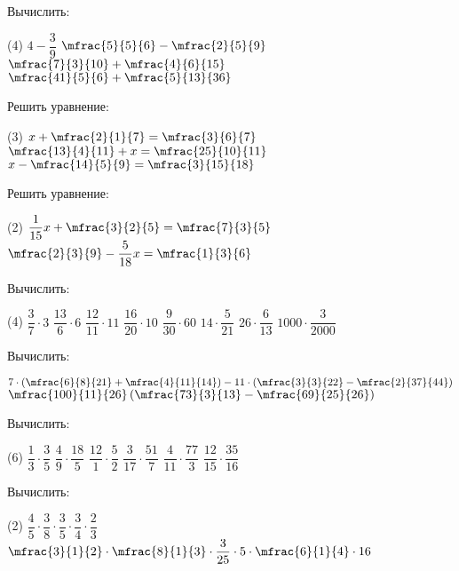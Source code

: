 \begin{class}[number=4]
	\begin{listofex}
		\item Вычислить:
		\begin{tasks}(4)
			\task \( 4-\dfrac{3}{9} \)
			\task \( \mfrac{5}{5}{6}-\mfrac{2}{5}{9} \)
			\task \( \mfrac{7}{3}{10}+\mfrac{4}{6}{15} \)
			\task \( \mfrac{41}{5}{6}+\mfrac{5}{13}{36} \)
		\end{tasks}
		\item Решить уравнение:
		\begin{tasks}(3)
			\task \( x+\mfrac{2}{1}{7}=\mfrac{3}{6}{7} \)
			\task \( \mfrac{13}{4}{11}+x=\mfrac{25}{10}{11} \)
			\task \( x-\mfrac{14}{5}{9}=\mfrac{3}{15}{18} \)
		\end{tasks}
		\item Решить уравнение:
		\begin{tasks}(2)
			\task \( \dfrac{1}{15}x+\mfrac{3}{2}{5}=\mfrac{7}{3}{5} \)
			\task \( \mfrac{2}{3}{9}-\dfrac{5}{18}x=\mfrac{1}{3}{6} \)
		\end{tasks}
		\item Вычислить:
		\begin{tasks}(4)
			\task \( \dfrac{3}{7}\cdot3 \)
			\task \( \dfrac{13}{6}\cdot6 \)
			\task \( \dfrac{12}{11}\cdot11 \)
			\task \( \dfrac{16}{20}\cdot10 \)
			\task \( \dfrac{9}{30}\cdot60 \)
			\task \( 14\cdot\dfrac{5}{21} \)
			\task \( 26\cdot\dfrac{6}{13} \)
			\task \( 1000\cdot\dfrac{3}{2000} \)
		\end{tasks}
		\item Вычислить:
		\begin{tasks}
			\task \( 7\cdot\left( \mfrac{6}{8}{21}+\mfrac{4}{11}{14} \right)-11\cdot\left( \mfrac{3}{3}{22}-\mfrac{2}{37}{44} \right) \)
			\task \( \mfrac{100}{11}{26}\left( \mfrac{73}{3}{13}-\mfrac{69}{25}{26} \right) \)
		\end{tasks}
		\item Вычислить:
		\begin{tasks}(6)
			\task \( \dfrac{1}{3}\cdot\dfrac{3}{5} \)
			\task \( \dfrac{4}{9}\cdot\dfrac{18}{5} \)
			\task \( \dfrac{12}{1}\cdot\dfrac{5}{2} \)
			\task \( \dfrac{3}{17}\cdot\dfrac{51}{7} \)
			\task \( \dfrac{4}{11}\cdot\dfrac{77}{3} \)
			\task \( \dfrac{12}{15}\cdot\dfrac{35}{16} \)
		\end{tasks}
		\item Вычислить:
		\begin{tasks}(2)
			\task \( \dfrac{4}{5}\cdot\dfrac{3}{8}\cdot\dfrac{3}{5}\cdot\dfrac{3}{4}\cdot\dfrac{2}{3} \)
			\task \( \mfrac{3}{1}{2}\cdot\mfrac{8}{1}{3}\cdot\dfrac{3}{25}\cdot5\cdot\mfrac{6}{1}{4}\cdot16 \)
		\end{tasks}
	\end{listofex}
\end{class}

